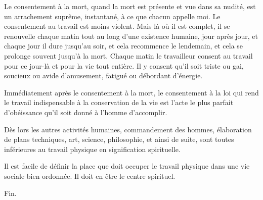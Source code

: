 \documentclass[french,twoside]{book} %
\newif\ifdev
\renewcommand{\LettrineFontHook}{\color{rubric}}
\newcommand{\initialiv}[2]{%
  \let\oldLFH\LettrineFontHook
  \IfSubStr{QJ’}{#1}{
    \lettrine[lines=4, lhang=0.2, loversize=-0.1, lraise=0.2]{\smash{#1}}{#2}
  }{\IfSubStr{É}{#1}{
    \lettrine[lines=4, lhang=0.2, loversize=-0, lraise=0]{\smash{#1}}{#2}
  }{\IfSubStr{ÀÂ}{#1}{
    \lettrine[lines=4, lhang=0.2, loversize=-0, lraise=0, slope=0.6em]{\smash{#1}}{#2}
  }{\IfSubStr{A}{#1}{
    \lettrine[lines=4, lhang=0.2, loversize=0.2, slope=0.6em]{\smash{#1}}{#2}
  }{\IfSubStr{V}{#1}{
    \lettrine[lines=4, lhang=0.2, loversize=0.2, slope=-0.5em]{\smash{#1}}{#2}
  }{
    \lettrine[lines=4, lhang=0.2, loversize=0.2]{\smash{#1}}{#2}
  }}}}}
  \let\LettrineFontHook\oldLFH
}
\renewcommand{\LettrineFontHook}{\bfseries\color{rubric}}
\begin{document}
Le consentement à la mort, quand la mort est présente et vue dans sa nudité, est un arrachement suprême, instantané, à ce que chacun appelle moi. Le consentement au travail est moins violent. Mais là où il est complet, il se renouvelle chaque matin tout au long d'une existence humaine, jour après jour, et chaque jour il dure jusqu'au soir, et cela recommence le lendemain, et cela se prolonge souvent jusqu'à la mort. Chaque matin le travailleur consent au travail pour ce jour-là et pour la vie tout entière. Il y consent qu'il soit triste ou gai, soucieux ou avide d'amusement, fatigué ou débordant d'énergie.\par
Immédiatement après le consentement à la mort, le consentement à la loi qui rend le travail indispensable à la conservation de la vie est l'acte le plus parfait d'obéissance qu'il soit donné à l'homme d'accomplir.\par
Dès lors les autres activités humaines, commandement des hommes, élaboration de plans techniques, art, science, philosophie, et ainsi de suite, sont toutes inférieures au travail physique en signification spirituelle.\par
Il est facile de définir la place que doit occuper le travail physique dans une vie sociale bien ordonnée. Il doit en être le centre spirituel.\par
Fin.
 


\ifbooklet
  \newpage\null\thispagestyle{empty}\newpage
\fi

\ifdev %
\fontname\font — \textsc{Les règles du jeu}\par
(\hyperref[utopie]{\underline{Lien}})\par
\noindent \initialiv{A}{lors là}\blindtext\par
\noindent \initialiv{À}{ la bonheur des dames}\blindtext\par
\noindent \initialiv{É}{tonnez-le}\blindtext\par
\noindent \initialiv{Q}{ualitativement}\blindtext\par
\noindent \initialiv{V}{aloriser}\blindtext\par
\Blindtext
\phantomsection
\label{utopie}
\Blinddocument
\fi
\end{document}

